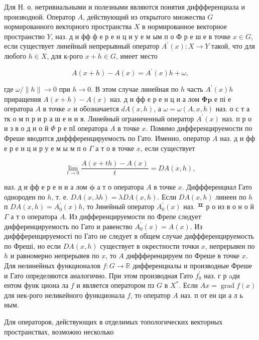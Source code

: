 \documentclass[10pt]{article}
\begin{document}
Для Н. о. нетривиальными и полезными являются понятия диффференциала и производной. Оператор $A$, действующий из открытого множества $G$ нормированного векторного пространства $X$ в нормированное векторное пространство $Y$, наз. д и фф ф е р е н ц и у е м ым п о Ф р е ш е в точке $x \in G$, если существует линейный непрерывный оператор $A^{\prime}(x): X \rightarrow Y$ такой, что для любого $h \in X$, для к-рого $x+h \in G$, имеет место



\[

A(x+h)-A(x)=A^{\prime}(x) h+\omega,

\]



где $\omega /\|h\| \rightarrow 0$ при $h \rightarrow 0$. В этом случае линейная по $h$ часть $A^{\prime}(x) h$ приращения $A(x+h)-A(x)$ наз. д и ф$ф$ е р е н ц и а лом $\boldsymbol{\Phi} \mathbf{p}$ е пі е огератора $A$ в точке $x$ и обозначается $d A(x, h)$, а $\omega=\omega(A, x, h)$ наз. о с т а тк о м п р и р а ш е н и я. Линейный ограниченный оператор $A^{\prime}(x)$ наз. п р о и з в о д н о й $\Phi$ р е пI оператора $A$ в точке $x$. Помимо дифференцируемости по Фреше вводится диффференцируемость по Гато. Именно, оператор $A$ наз. д и фф е р е н ц и р у е м ы м п о $\Gamma$ а т о в точке $x$, если существует



\[

\lim _{t \rightarrow 0} \frac{A(x+t h)-A(x)}{t}=D A(x, h),

\]



наз. д и $ф ф$ е р е н и а лом $\boldsymbol{\phi}$ а т о оператора $A$ в точке $x$. Диффференциал Гато однороден по $h$, т. е. $D A(x, \lambda h)=\lambda D A(x, h)$. Если $D A(x, h)$ линеен по $h$ п $D A(x, h)=A_{0}^{\prime}(x) h$, то Јинейный оператор $A_{0}^{\prime}(x)$ наз. ᄑ р о из в о н о й $\Gamma$ а т о оператора $A$. Из дифференцируемости по Фрепе следует дифференцируемость по Гато и равенство $A_{0}^{\prime}(x)=A(x)$. Из диффференцируемості по Гато не следует в общем случае диффференцируемость по Фреші, но если $D A(x, h)$ существует в окрестности точки $x$, непрерывен по $h$ и равномерно непрерывев по $x$, то $A$ диффференцируем по Фреше в точке $x$. Для нелинейных функционалов $f: G \rightarrow \mathbb{R}$ дифференциалы и производные Фреше и Гато определяются аналогично. При этом производная Гато $f_{0}^{\prime}$ наз. г р aди ентом функ циона ла $f$ и является оператором пз $G$ в $X^{*}$. Если $A x=\operatorname{grad} f(x)$ для нек-рого неликейного функционала $f$, то оператор $A$ наз. п от ен ци а л ь ным.



Для операторов, действующих в отделимых топологических векторных пространствах, возможно несколько
\end{document}
